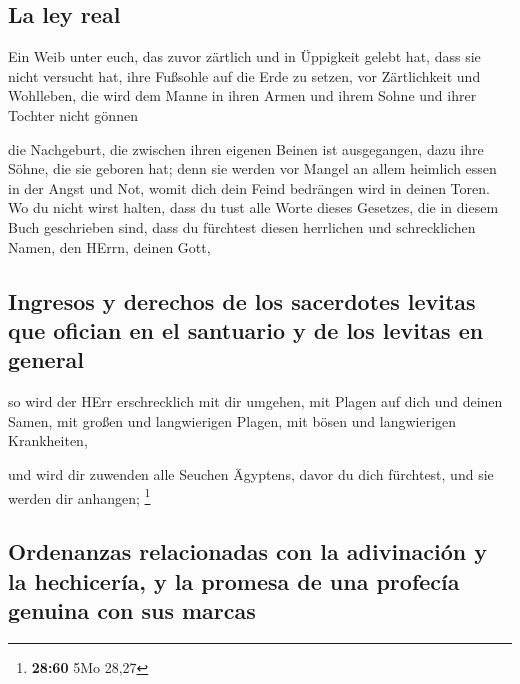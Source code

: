 \hypertarget{la-ley-real}{%
\subsection{La ley real}\label{la-ley-real}}

 Ein Weib unter euch, das zuvor zärtlich und in Üppigkeit
gelebt hat, dass sie nicht versucht hat, ihre Fußsohle auf die Erde zu
setzen, vor Zärtlichkeit und Wohlleben, die wird dem Manne in ihren
Armen und ihrem Sohne und ihrer Tochter nicht gönnen

 die Nachgeburt, die zwischen ihren eigenen Beinen ist
ausgegangen, dazu ihre Söhne, die sie geboren hat; denn sie werden vor
Mangel an allem heimlich essen in der Angst und Not, womit dich dein
Feind bedrängen wird in deinen Toren.  Wo du nicht wirst
halten, dass du tust alle Worte dieses Gesetzes, die in diesem Buch
geschrieben sind, dass du fürchtest diesen herrlichen und schrecklichen
Namen, den HErrn, deinen Gott,

\hypertarget{ingresos-y-derechos-de-los-sacerdotes-levitas-que-ofician-en-el-santuario-y-de-los-levitas-en-general}{%
\subsection{Ingresos y derechos de los sacerdotes levitas que ofician en
el santuario y de los levitas en
general}\label{ingresos-y-derechos-de-los-sacerdotes-levitas-que-ofician-en-el-santuario-y-de-los-levitas-en-general}}

 so wird der HErr erschrecklich mit dir umgehen, mit
Plagen auf dich und deinen Samen, mit großen und langwierigen Plagen,
mit bösen und langwierigen Krankheiten,

 und wird dir zuwenden alle Seuchen Ägyptens, davor du
dich fürchtest, und sie werden dir anhangen; \footnote{\textbf{28:60}
  5Mo 28,27}

\hypertarget{ordenanzas-relacionadas-con-la-adivinaciuxf3n-y-la-hechiceruxeda-y-la-promesa-de-una-profecuxeda-genuina-con-sus-marcas}{%
\subsection{Ordenanzas relacionadas con la adivinación y la hechicería,
y la promesa de una profecía genuina con sus
marcas}\label{ordenanzas-relacionadas-con-la-adivinaciuxf3n-y-la-hechiceruxeda-y-la-promesa-de-una-profecuxeda-genuina-con-sus-marcas}}


